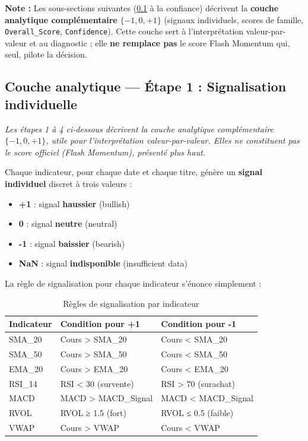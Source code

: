 \documentclass{rapportENSIAS} %
\begin{document}
\vspace{0.3cm}
\noindent
\textbf{Note :} Les sous-sections suivantes (\ref{ssec:signal-individuel} à la confiance) décrivent la \textbf{couche analytique complémentaire} $\{-1,0,+1\}$ (signaux individuels, scores de famille, \texttt{Overall\_Score}, \texttt{Confidence}). Cette couche sert à l'interprétation valeur-par-valeur et au diagnostic ; elle \textbf{ne remplace pas} le score Flash Momentum qui, seul, pilote la décision.

\subsection{Couche analytique --- Étape 1 : Signalisation individuelle}
\label{ssec:signal-individuel}

\noindent
\textit{Les étapes 1 à 4 ci-dessous décrivent la couche analytique complémentaire $\{-1,0,+1\}$, utile pour l'interprétation valeur-par-valeur. Elles ne constituent pas le score officiel (Flash Momentum), présenté plus haut.}

\vspace{0.2cm}
\noindent
Chaque indicateur, pour chaque date et chaque titre, génère un \textbf{signal individuel} discret à trois valeurs :

\begin{itemize}
    \item \textbf{+1} : signal \textbf{haussier} (bullish)
    \item \textbf{0} : signal \textbf{neutre} (neutral)
    \item \textbf{-1} : signal \textbf{baissier} (bearish)
    \item \textbf{NaN} : signal \textbf{indisponible} (insufficient data)
\end{itemize}

\vspace{0.2cm}
\noindent
La règle de signalisation pour chaque indicateur s'énonce simplement :

\vspace{0.3cm}
\noindent
\begin{table}[H]
\centering
\small
\begin{tabular}{lll}
\toprule
\textbf{Indicateur} & \textbf{Condition pour +1} & \textbf{Condition pour -1} \\
\midrule
SMA\_20 & Cours > SMA\_20 & Cours < SMA\_20 \\
SMA\_50 & Cours > SMA\_50 & Cours < SMA\_50 \\
EMA\_20 & Cours > EMA\_20 & Cours < EMA\_20 \\
RSI\_14 & RSI < 30 (survente) & RSI > 70 (surachat) \\
MACD & MACD > MACD\_Signal & MACD < MACD\_Signal \\
RVOL & RVOL ≥ 1.5 (fort) & RVOL ≤ 0.5 (faible) \\
VWAP & Cours > VWAP & Cours < VWAP \\
\bottomrule
\end{tabular}
\caption{Règles de signalisation par indicateur}
\label{tab:signal-rules}
\end{table}
\end{document}
